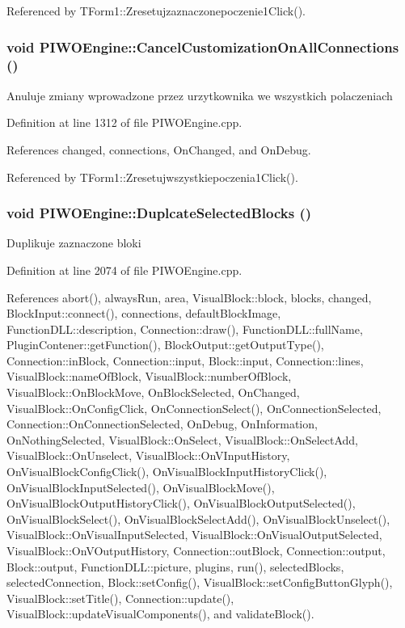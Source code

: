 Referenced by TForm1::Zresetujzaznaczonepoczenie1Click().\hypertarget{classPIWOEngine_0e28412b868f3042c7bf50e9ee8c40fc}{
\subsubsection[CancelCustomizationOnAllConnections]{\setlength{\rightskip}{0pt plus 5cm}void PIWOEngine::CancelCustomizationOnAllConnections ()}}
\label{classPIWOEngine_0e28412b868f3042c7bf50e9ee8c40fc}


Anuluje zmiany wprowadzone przez urzytkownika we wszystkich polaczeniach 

Definition at line 1312 of file PIWOEngine.cpp.

References changed, connections, OnChanged, and OnDebug.

Referenced by TForm1::Zresetujwszystkiepoczenia1Click().\hypertarget{classPIWOEngine_6e37ad69880f3d9a9ad7cf9b57d894a9}{
\subsubsection[DuplcateSelectedBlocks]{\setlength{\rightskip}{0pt plus 5cm}void PIWOEngine::DuplcateSelectedBlocks ()}}
\label{classPIWOEngine_6e37ad69880f3d9a9ad7cf9b57d894a9}


Duplikuje zaznaczone bloki 

Definition at line 2074 of file PIWOEngine.cpp.

References abort(), alwaysRun, area, VisualBlock::block, blocks, changed, BlockInput::connect(), connections, defaultBlockImage, FunctionDLL::description, Connection::draw(), FunctionDLL::fullName, PluginContener::getFunction(), BlockOutput::getOutputType(), Connection::inBlock, Connection::input, Block::input, Connection::lines, VisualBlock::nameOfBlock, VisualBlock::numberOfBlock, VisualBlock::OnBlockMove, OnBlockSelected, OnChanged, VisualBlock::OnConfigClick, OnConnectionSelect(), OnConnectionSelected, Connection::OnConnectionSelected, OnDebug, OnInformation, OnNothingSelected, VisualBlock::OnSelect, VisualBlock::OnSelectAdd, VisualBlock::OnUnselect, VisualBlock::OnVInputHistory, OnVisualBlockConfigClick(), OnVisualBlockInputHistoryClick(), OnVisualBlockInputSelected(), OnVisualBlockMove(), OnVisualBlockOutputHistoryClick(), OnVisualBlockOutputSelected(), OnVisualBlockSelect(), OnVisualBlockSelectAdd(), OnVisualBlockUnselect(), VisualBlock::OnVisualInputSelected, VisualBlock::OnVisualOutputSelected, VisualBlock::OnVOutputHistory, Connection::outBlock, Connection::output, Block::output, FunctionDLL::picture, plugins, run(), selectedBlocks, selectedConnection, Block::setConfig(), VisualBlock::setConfigButtonGlyph(), VisualBlock::setTitle(), Connection::update(), VisualBlock::updateVisualComponents(), and validateBlock().


